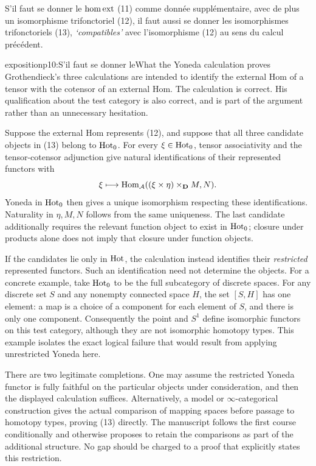 S’il faut se donner le $\mathrm{hom}\,\mathrm{ext}$ (11) comme donnée supplémentaire, avec de plus un isomorphisme trifonctoriel (12), il faut aussi se donner les isomorphismes trifonctoriels (13), \textit{‘compatibles’} avec l’isomorphisme (12) au sens du calcul précédent.

\begin{dcomment}{exposition}{p10:S’il faut se donner le}{What the Yoneda calculation proves}
Grothendieck's three calculations are intended to identify the external Hom of a tensor with the cotensor of an external Hom. The calculation is correct. His qualification about the test category is also correct, and is part of the argument rather than an unnecessary hesitation.

Suppose the external Hom represents (12), and suppose that all three candidate objects in (13) belong to \(\mathrm{Hot}_0\). For every \(\xi\in\mathrm{Hot}_0\), tensor associativity and the tensor-cotensor adjunction give natural identifications of their represented functors with
\[
 \xi\longmapsto
 \mathrm{Hom}_{\mathcal A}((\xi\times\eta)\times_{\mathbf{D}}M,N).
\]
Yoneda in \(\mathrm{Hot}_0\) then gives a unique isomorphism respecting these identifications. Naturality in \(\eta,M,N\) follows from the same uniqueness. The last candidate additionally requires the relevant function object to exist in \(\mathrm{Hot}_0\); closure under products alone does not imply that closure under function objects.

If the candidates lie only in \(\mathrm{Hot}\), the calculation instead identifies their \emph{restricted} represented functors. Such an identification need not determine the objects. For a concrete example, take \(\mathrm{Hot}_0\) to be the full subcategory of discrete spaces. For any discrete set \(S\) and any nonempty connected space \(H\), the set \([S,H]\) has one element: a map is a choice of a component for each element of \(S\), and there is only one component. Consequently the point and \(S^1\) define isomorphic functors on this test category, although they are not isomorphic homotopy types. This example isolates the exact logical failure that would result from applying unrestricted Yoneda here.

There are two legitimate completions. One may assume the restricted Yoneda functor is fully faithful on the particular objects under consideration, and then the displayed calculation suffices. Alternatively, a model or \(\infty\)-categorical construction gives the actual comparison of mapping spaces before passage to homotopy types, proving (13) directly. The manuscript follows the first course conditionally and otherwise proposes to retain the comparisons as part of the additional structure. No gap should be charged to a proof that explicitly states this restriction.
\end{dcomment}


